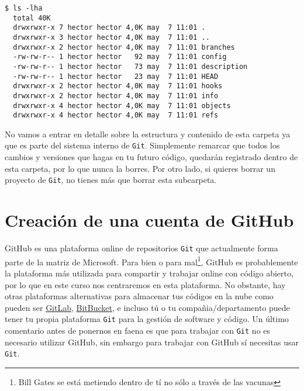 \documentclass[a4paper,10pt]{report}
\begin{document}
    \begin{lstlisting}[frame=single]
$ ls -lha
  total 40K
  drwxrwxr-x 7 hector hector 4,0K may  7 11:01 .
  drwxrwxr-x 3 hector hector 4,0K may  7 11:01 ..
  drwxrwxr-x 2 hector hector 4,0K may  7 11:01 branches
  -rw-rw-r-- 1 hector hector   92 may  7 11:01 config
  -rw-rw-r-- 1 hector hector   73 may  7 11:01 description
  -rw-rw-r-- 1 hector hector   23 may  7 11:01 HEAD
  drwxrwxr-x 2 hector hector 4,0K may  7 11:01 hooks
  drwxrwxr-x 2 hector hector 4,0K may  7 11:01 info
  drwxrwxr-x 4 hector hector 4,0K may  7 11:01 objects
  drwxrwxr-x 4 hector hector 4,0K may  7 11:01 refs
    \end{lstlisting}
  
    No vamos a entrar en detalle sobre la estructura y contenido de esta carpeta ya que es parte del sistema interno de \verb+Git+. Simplemente remarcar que todos los cambios y versiones que hagas en tu futuro código, quedarán registrado dentro de esta carpeta, por lo que nunca la borres. Por otro lado, si quieres borrar un proyecto de \verb+Git+, no tienes más que borrar esta subcarpeta.
  
  \section{Creación de una cuenta de GitHub}
    GitHub es una plataforma online de repositorios \verb+Git+ que actualmente forma parte de la matriz de Microsoft. Para bien o para mal\footnote{Bill Gates se está metiendo dentro de tí no sólo a través de las vacunas}, GitHub es probablemente la plataforma más utilizada para compartir y trabajar online con código abierto, por lo que en este curso nos centraremos en esta plataforma. No obstante, hay otras plataformas alternativas para almacenar tus códigos en la nube como pueden ser \href{https://about.gitlab.com}{GitLab}, \href{https://bitbucket.org}{BitBucket}, e incluso tú o tu compañia/departamento puede tener tu propia plataforma \verb+Git+ para la gestión de software y código. Un último comentario antes de ponernos en faena es que para trabajar con \verb+Git+ no es necesario utilizar GitHub, sin embargo para trabajar con GitHub sí necesitas usar \verb+Git+. 
  

   
   

 
\end{document}
